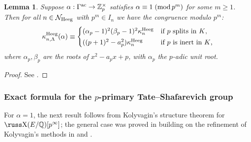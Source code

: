 \documentclass[10pt,reqno]{amsart}
\numberwithin{equation}{section}
\theoremstyle{plain}
\theoremstyle{definition}
\theoremstyle{definition}
\theoremstyle{plain}
\theoremstyle{plain}
\newtheorem{lemma}[thm]{Lemma}
\theoremstyle{plain}
\theoremstyle{plain}
\theoremstyle{plain}
\theoremstyle{plain}
\newcommand{\al}{\alpha} %
\newcommand{\Z}{\mathbb{Z}}
\newcommand{\Q}{\mathbb{Q}}
\newcommand{\p}{\mathfrak{P}}
\def\sha{\hbox{\russ\char88}}
\newcommand{\Lcal}{\mathcal{L}}
\newcommand{\Fcal}{\mathcal{F}}
\newcommand{\rH}{\mathrm{H}}
\begin{document}
\begin{lemma}\label{lemmacongruence}
Suppose $\alpha:\Gamma^{\rm ac}\rightarrow\Z_p^\times$ satisfies $\alpha\equiv 1\;({\rm mod}\,p^m)$ for some $m\geq 1$. Then for all $n\in\mathcal{N}_{\rm Heeg}$ with $p^m\in I_n$ we have the congruence modulo $p^m$:
\[
\kappa_{n,\Lambda}^{\rm Heeg}(\alpha)\equiv 
\begin{cases} (\alpha_p-1)^2(\beta_p-1)^2 \kappa_n^{\rm Heeg} & \text{if $p$ splits in $K$,} \\[0.2em] 
((p+1)^2-a_p^2) \kappa_n^{\rm Heeg} & \text{if $p$ is inert in $K$,}\end{cases} %
\]
where $\alpha_p,\beta_p$ are the roots of  
$x^2-a_px+p$, with $\alpha_p$ the $p$-adic unit root.
\end{lemma} 

\begin{proof}
See \cite[Lem.~1.1.5]{BCGS}.
\end{proof}





\subsubsection{Exact formula for the $p$-primary Tate--Shafarevich group} 
 
For $\alpha=1$, the next result follows from Kolyvagin's structure theorem \cite[Thm.~C]{kolyvagin-sha} for $\sha(E/\Q)[p^\infty]$; the general case was proved in \cite{BCGS} building on the refinement of Kolyvagin's methods in \cite{howard,zanarella}  and \cite{eisenstein,eisenstein_cyc}. 


\end{document}
